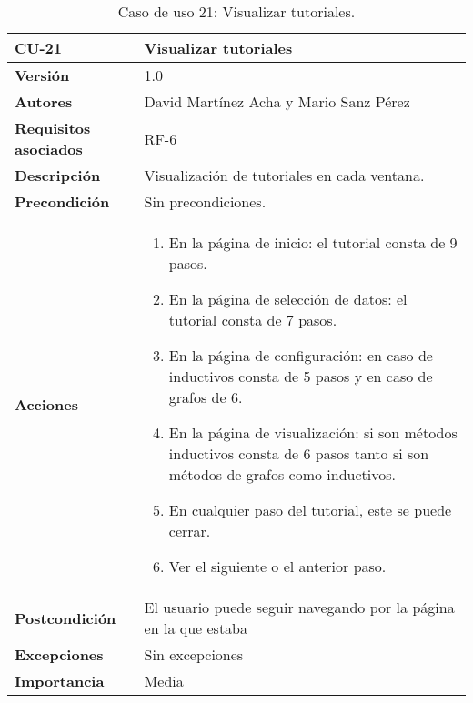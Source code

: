 \begin{table}[p]
	\centering
	\begin{tabularx}{\linewidth}{ p{} p{} }
		\toprule
		\textbf{CU-21}    & \textbf{Visualizar tutoriales}\\
		\toprule
		\textbf{Versión}              & 1.0    \\
		\textbf{Autores}                & David Martínez Acha y Mario Sanz Pérez\\
		\textbf{Requisitos asociados} & RF-6 \\
		\textbf{Descripción}          & Visualización de tutoriales en cada ventana. \\
		\textbf{Precondición}         & Sin precondiciones. \\
		\textbf{Acciones}             &
		\begin{enumerate}
			\def\labelenumi{\arabic{enumi}.}
			\tightlist
			\item En la página de inicio: el tutorial consta de 9 pasos.
			\item En la página de selección de datos: el tutorial consta de 7 pasos.
			\item En la página de configuración: en caso de inductivos consta de 5 pasos y en caso de grafos de 6.
			\item En la página de visualización: si son métodos inductivos consta de 6 pasos tanto si son métodos de grafos como inductivos.
			\item En cualquier paso del tutorial, este se puede cerrar.
			\item Ver el siguiente o el anterior paso.
		\end{enumerate}\\
		\textbf{Postcondición}        & El usuario puede seguir navegando por la página en la que estaba \\
		\textbf{Excepciones}          & Sin excepciones \\
		\textbf{Importancia}          & Media \\
		\bottomrule
	\end{tabularx}
	\caption[CU-21: Visualizar tutoriales]{Caso de uso 21: Visualizar tutoriales.}
\end{table}